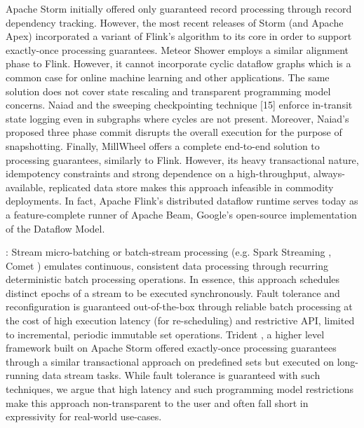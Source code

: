 Apache Storm \cite{CUSTOM:web/Storm} initially offered only guaranteed record processing through record dependency tracking. However, the most recent releases of Storm (and Apache Apex\cite{CUSTOM:web/apex}) incorporated a variant of Flink's algorithm to its core in order to support exactly-once processing guarantees. Meteor Shower \cite{wang2012meteor} employs a similar alignment phase to Flink. However, it cannot incorporate cyclic dataflow graphs which is a common case for online machine learning \cite{de2015samoa} and other applications. The same solution does not cover state rescaling and transparent programming model concerns. Naiad \cite{murray2013naiad} and the sweeping checkpointing technique [15] enforce in-transit state logging even in subgraphs where cycles are not present. Moreover, Naiad's proposed three phase commit disrupts the overall execution for the purpose of snapshotting. Finally, MillWheel \cite{millwheel} offers a complete end-to-end solution to processing guarantees, similarly to Flink. However, its heavy transactional nature, idempotency constraints and strong dependence on a high-throughput, always-available, replicated data store \cite{chang2008bigtable} makes this approach infeasible in commodity deployments. In fact, Apache Flink's distributed dataflow runtime serves today as a feature-complete runner of Apache Beam\cite{CUSTOM:web/beam}, Google's open-source implementation of the Dataflow Model\cite{CUSTOM:web/Dataflow}.

: Stream micro-batching or batch-stream processing (e.g. Spark Streaming \cite{zaharia2012discretized}, Comet \cite{he2010comet}) emulates continuous, consistent data processing through recurring deterministic batch processing operations. In essence, this approach schedules distinct epochs of a stream to be executed synchronously. Fault tolerance and reconfiguration is guaranteed out-of-the-box through reliable batch processing at the cost of high execution latency (for re-scheduling) and restrictive API, limited to incremental, periodic immutable set operations. Trident \cite{CUSTOM:web/trident}, a higher level framework built on Apache Storm offered exactly-once processing guarantees through a similar transactional approach on predefined sets but executed on long-running data stream tasks. While fault tolerance is guaranteed with such techniques, we argue that high latency and such programming model restrictions make this approach non-transparent to the user and often fall short in expressivity for real-world use-cases.
